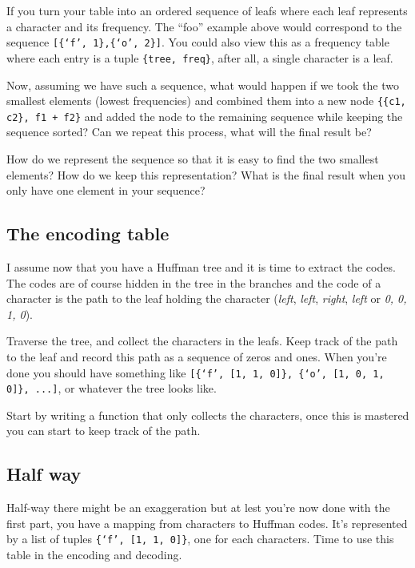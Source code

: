 \documentclass[a4paper,11pt]{article}
\begin{document}
If you turn your table into an ordered sequence of leafs where each
leaf represents a character and its frequency. The ``foo'' example
above would correspond to the sequence {\tt [\{`f', 1\},\{`o', 2\}]}.
You could also view this as a frequency table where each entry is a
tuple {\tt \{tree, freq\}}, after all, a single character is a leaf.

Now, assuming we have such a sequence, what would happen if we took
the two smallest elements (lowest frequencies) and combined them into
a new node {\tt \{\{c1, c2\}, f1 + f2\}} and added the node to the
remaining sequence while keeping the sequence sorted? Can we repeat
this process, what will the final result be?

How do we represent the sequence so that it is easy to find the two
smallest elements? How do we keep this representation? What is the
final result when you only have one element in your sequence?


\subsection{The encoding table}

I assume now that you have a Huffman tree and it is time to extract
the codes. The codes are of course hidden in the tree in the branches
and the code of a character is the path to the leaf holding the
character ({\em left}, {\em left}, {\em right}, {\em left} or {\em
  0, 0, 1, 0}).
  
Traverse the tree, and collect the characters in the leafs. Keep track
of the path to the leaf and record this path as a sequence of zeros
and ones. When you're done you should have something like
{\tt [\{`f', [1, 1, 0]\}, \{`o', [1, 0, 1, 0]\}, ...]}, or whatever the tree
looks like.

Start by writing a function that only collects the characters, once
this is mastered you can start to keep track of the path.


\subsection{Half way}

Half-way there might be an exaggeration but at lest you're now done
with the first part, you have a mapping from characters to Huffman
codes. It's represented by a list of tuples {\tt \{`f', [1, 1, 0]\}},
one for each characters. Time to use this table in the encoding and
decoding.
\end{document}
